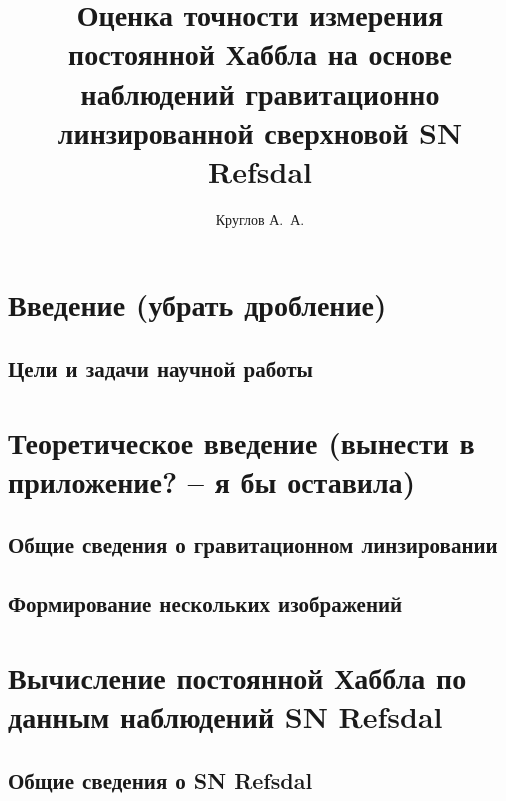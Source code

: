 \documentclass{mipt-thesis-ms}
\numberwithin{equation}{chapter}
\begin{document}
\title{Оценка точности измерения постоянной Хаббла на основе наблюдений гравитационно линзированной сверхновой SN Refsdal}
\author{Круглов А.\ А.}

\frontmatter

\mainmatter

\titlecontents 


\chapter{Введение (убрать дробление)}

%
%
\section{Цели и задачи научной работы}





\chapter{Теоретическое введение (вынести в приложение? -- \textbf{ я бы оставила})}

\section{Общие сведения о гравитационном линзировании}

\section{Формирование нескольких изображений}


\chapter{Вычисление постоянной Хаббла по данным наблюдений SN Refsdal}

\section{Общие сведения о SN Refsdal}

\end{document}

